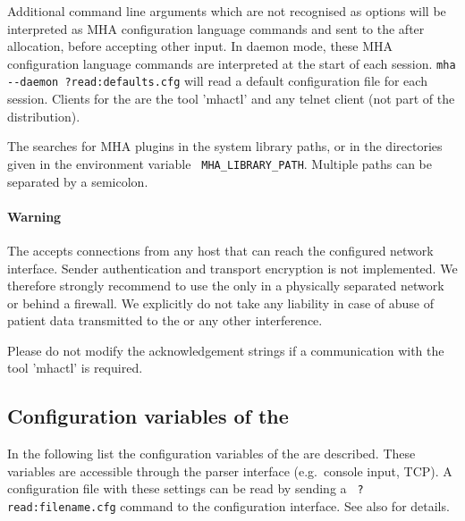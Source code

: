 Additional command line arguments which are not recognised as options
will be interpreted as MHA configuration language commands and sent to the
\mhad{} after allocation, before accepting other input.
%
In daemon mode, these MHA configuration language commands are interpreted at the 
start of each session.
\verb!mha --daemon ?read:defaults.cfg! will read a default
configuration file for each session.
%
Clients for the \mhad{} are the \Matlab{} tool 'mhactl' and any
telnet client (not part of the distribution).

The \mhad{} searches for MHA plugins in the system library paths, or in
the directories given in the environment variable {\tt
MHA\_LIBRARY\_PATH}.
%
Multiple paths can be separated by a semicolon.

\paragraph{Warning}

The \mhad{} accepts connections from any host that can reach
the configured network interface.
%
Sender authentication and transport encryption is not implemented.
%
We therefore strongly recommend to use the \mhad{} only in a
physically separated network or behind a firewall.
%
We explicitly do not take any liability in case of abuse of patient
data transmitted to the \mhad{} or any other interference.

Please do not modify the acknowledgement strings if a communication
with the \Matlab{} tool 'mhactl' is required.

\subsection{Configuration variables of the \mhad{}}

In the following list the configuration variables of the \mhad{} are
described. These variables are accessible through the parser interface
(e.g.\ console input, TCP).
%
A configuration file with these settings can be read by sending a {\tt
?read:filename.cfg} command to the configuration interface. See also
 for details.

